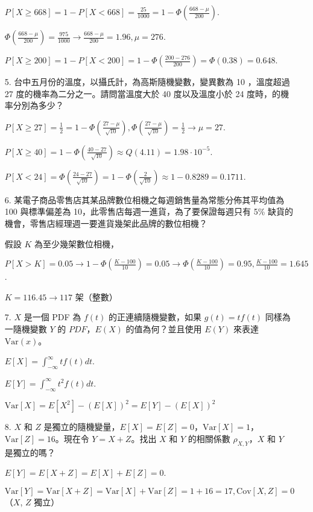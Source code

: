 \documentclass{article}
\begin{document}
\begin{enumerate}
    $P[X \ge 668] = 1 - P[X < 668] = \frac{25}{1000} = 1 - \Phi(\frac{668 - \mu}{200})$.

    $\Phi(\frac{668 - \mu}{200}) = \frac{975}{1000} \to \frac{668 - \mu}{200} = 1.96, \mu = 276$.

    $P[X \ge 200] = 1 - P[X < 200] = 1 - \Phi(\frac{200 - 276}{200}) = \Phi(0.38) = 0.648$.

    \item [5.] 台中五月份的溫度，以攝氏計，為高斯隨機變數，變異數為 10 ，溫度超過 27 度的機率為二分之一。請問當溫度大於 40 度以及溫度小於 24 度時，的機率分別為多少？

    $P[X \ge 27] = \frac{1}{2} = 1 - \Phi(\frac{27 - \mu}{\sqrt{10}}), \Phi(\frac{27 - \mu}{\sqrt{10}}) = \frac{1}{2} \to \mu = 27$.

    $P[X \ge 40] = 1 - \Phi(\frac{40 - 27}{\sqrt{10}}) \approx Q(4.11) = 1.98 \cdot 10^{-5}$.

    $P[X < 24] = \Phi(\frac{24 - 27}{\sqrt{10}}) = 1 - \Phi(\frac{2}{\sqrt{10}}) \approx 1 - 0.8289 = 0.1711$.

    \item [6.] 某電子商品零售店其某品牌數位相機之每週銷售量為常態分佈其平均值為 100 與標準偏差為 10，此零售店每週一進貨，為了要保證每週只有 5\% 缺貨的機會，零售店經理週一要進貨幾架此品牌的數位相機？

    假設 $K$ 為至少幾架數位相機，

    $P[X > K] = 0.05 \to 1 - \Phi(\frac{K - 100}{10}) = 0.05 \to \Phi(\frac{K - 100}{10}) = 0.95, \frac{K - 100}{10} = 1.645$.

    $K = 116.45 \to 117$ 架（整數）

    \item [7.] $X$ 是一個 PDF 為 $f(t)$ 的正連續隨機變數，如果 $g(t)= tf(t)$ 同樣為一隨機變數 $Y$ 的 $PDF$，$E(X)$ 的值為何？並且使用 $E(Y)$ 來表達 $\text{Var}(x)$。

    $E[X] = \int_{-\infty}^\infty tf(t) dt$.
    
    $E[Y] = \int_{-\infty}^\infty t^2f(t) dt$.

    $\text{Var}[X] = E[X^2] - (E[X])^2 = E[Y] - (E[X])^2$

    \item [8.] $X$ 和 $Z$ 是獨立的隨機變量，$E[X] = E[Z] = 0$，$\text{Var}[X] = 1$，$\text{Var}[Z] = 16$。現在令 $Y = X + Z$。找出 $X $ 和 $Y$ 的相關係數 $\rho_{X, Y}$，$X$ 和 $Y$ 是獨立的嗎？

    $E[Y] = E[X + Z] = E[X] + E[Z] = 0$.

    $\text{Var}[Y] = \text{Var}[X + Z] = \text{Var}[X] + \text{Var}[Z] = 1 + 16 = 17, \text{Cov}[X, Z] = 0$（$X$, $Z$ 獨立）


\end{enumerate}
\end{document}
